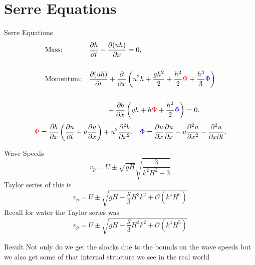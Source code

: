 \documentclass[handout]{beamer}
\begin{document}
\section{Serre Equations}
\begin{frame}{Serre Equations}
	\begin{subequations}
		\begin{align*}
		&\text{Mass:} && \frac{\partial h}{\partial t} + \dfrac{\partial (uh)}{\partial x} = 0,  \\ \\
		&\text{Momentum:} &&\dfrac{\partial (uh)}{\partial t} + \dfrac{\partial}{\partial x} \left ( u^2h + \dfrac{gh^2}{2} + \dfrac{h^2}{2}{ \color{red}\Psi } + \dfrac{h^3}{3}{ { \color{blue} \Phi } }  \right )   \\ \\& &&\quad \quad \; \; +  \dfrac{\partial b}{\partial x} \left (gh +   h { \color{red}\Psi } + \dfrac{h^2}{2}{ { \color{blue} \Phi } }  \right ) = 0.
		\end{align*}
	\end{subequations}
	\begin{align*}
	&{ \color{red}\Psi }  = \dfrac{\partial b}{\partial x}\left(\dfrac{\partial u}{\partial t} + u\dfrac{\partial u}{\partial x} \right)  + u^2\dfrac{\partial^2 b}{\partial x^2}, &
	{ \color{blue} \Phi }  = \dfrac{\partial u }{\partial x} \dfrac{\partial u}{\partial x} -u \dfrac{\partial^2 u}{\partial x^2}  - \dfrac{\partial^2 u}{\partial x \partial t} .
	\end{align*}
\end{frame}

\begin{frame}{Wave Speeds}
	$$ v_p = U \pm \sqrt{gH} \sqrt{\frac{3}{k^2 H^2 +3}} $$
	\pause
	Taylor series of this is
	$$v_p = U \pm \sqrt{gH - \frac{g}{3} H^3 k^2 +  \mathcal{O}\left(k^4H^5\right)}$$
	\pause \newline
	Recall for water the Taylor series was
	$$v_p = U \pm \sqrt{gH - \frac{g}{3} H^3 k^2 +  \mathcal{O}\left(k^4H^5\right)}$$
\end{frame}

\begin{frame}{Result}
	Not only do we get the shocks due to the bounds on the wave speeds but we also get some of that internal structure we see in the real world
\end{frame}
\end{document}
